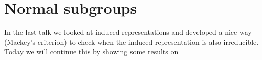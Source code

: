 \documentclass[a4paper]{article}
\begin{document}
\section{Normal subgroups}
\begin{intro*}
  In the last talk we looked at induced representations and developed a nice way (Mackey's criterion) to check when the induced representation is also irreducible. Today we will continue this by showing some results on
\end{intro*}
\end{document}
